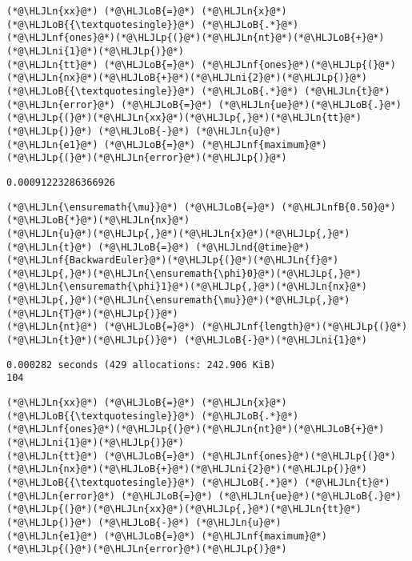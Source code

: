 \documentclass[12pt,landscape]{article}
\newcommand{\HLJLn}[1]{#1}
\newcommand{\HLJLnd}[1]{\textcolor[RGB]{214,102,97}{#1}}
\newcommand{\HLJLnf}[1]{\textcolor[RGB]{66,102,213}{#1}}
\newcommand{\HLJLnfB}[1]{\textcolor[RGB]{59,151,46}{#1}}
\newcommand{\HLJLni}[1]{\textcolor[RGB]{59,151,46}{#1}}
\newcommand{\HLJLoB}[1]{\textcolor[RGB]{102,102,102}{\textbf{#1}}}
\newcommand{\HLJLp}[1]{#1}
\begin{document}
{\begin{lstlisting}
(*@\HLJLn{xx}@*) (*@\HLJLoB{=}@*) (*@\HLJLn{x}@*)(*@\HLJLoB{{\textquotesingle}}@*) (*@\HLJLoB{.*}@*) (*@\HLJLnf{ones}@*)(*@\HLJLp{(}@*)(*@\HLJLn{nt}@*)(*@\HLJLoB{+}@*)(*@\HLJLni{1}@*)(*@\HLJLp{)}@*)
(*@\HLJLn{tt}@*) (*@\HLJLoB{=}@*) (*@\HLJLnf{ones}@*)(*@\HLJLp{(}@*)(*@\HLJLn{nx}@*)(*@\HLJLoB{+}@*)(*@\HLJLni{2}@*)(*@\HLJLp{)}@*)(*@\HLJLoB{{\textquotesingle}}@*) (*@\HLJLoB{.*}@*) (*@\HLJLn{t}@*)
(*@\HLJLn{error}@*) (*@\HLJLoB{=}@*) (*@\HLJLn{ue}@*)(*@\HLJLoB{.}@*)(*@\HLJLp{(}@*)(*@\HLJLn{xx}@*)(*@\HLJLp{,}@*)(*@\HLJLn{tt}@*)(*@\HLJLp{)}@*) (*@\HLJLoB{-}@*) (*@\HLJLn{u}@*) 
(*@\HLJLn{e1}@*) (*@\HLJLoB{=}@*) (*@\HLJLnf{maximum}@*)(*@\HLJLp{(}@*)(*@\HLJLn{error}@*)(*@\HLJLp{)}@*)
\end{lstlisting}

\begin{lstlisting}
0.00091223286366926
\end{lstlisting}


\begin{lstlisting}
(*@\HLJLn{\ensuremath{\mu}}@*) (*@\HLJLoB{=}@*) (*@\HLJLnfB{0.50}@*)(*@\HLJLoB{*}@*)(*@\HLJLn{nx}@*)
(*@\HLJLn{u}@*)(*@\HLJLp{,}@*)(*@\HLJLn{x}@*)(*@\HLJLp{,}@*)(*@\HLJLn{t}@*) (*@\HLJLoB{=}@*) (*@\HLJLnd{@time}@*) (*@\HLJLnf{BackwardEuler}@*)(*@\HLJLp{(}@*)(*@\HLJLn{f}@*)(*@\HLJLp{,}@*)(*@\HLJLn{\ensuremath{\phi}0}@*)(*@\HLJLp{,}@*)(*@\HLJLn{\ensuremath{\phi}1}@*)(*@\HLJLp{,}@*)(*@\HLJLn{nx}@*)(*@\HLJLp{,}@*)(*@\HLJLn{\ensuremath{\mu}}@*)(*@\HLJLp{,}@*)(*@\HLJLn{T}@*)(*@\HLJLp{)}@*)
(*@\HLJLn{nt}@*) (*@\HLJLoB{=}@*) (*@\HLJLnf{length}@*)(*@\HLJLp{(}@*)(*@\HLJLn{t}@*)(*@\HLJLp{)}@*) (*@\HLJLoB{-}@*)(*@\HLJLni{1}@*)
\end{lstlisting}

\begin{lstlisting}
0.000282 seconds (429 allocations: 242.906 KiB)
104
\end{lstlisting}


\begin{lstlisting}
(*@\HLJLn{xx}@*) (*@\HLJLoB{=}@*) (*@\HLJLn{x}@*)(*@\HLJLoB{{\textquotesingle}}@*) (*@\HLJLoB{.*}@*) (*@\HLJLnf{ones}@*)(*@\HLJLp{(}@*)(*@\HLJLn{nt}@*)(*@\HLJLoB{+}@*)(*@\HLJLni{1}@*)(*@\HLJLp{)}@*)
(*@\HLJLn{tt}@*) (*@\HLJLoB{=}@*) (*@\HLJLnf{ones}@*)(*@\HLJLp{(}@*)(*@\HLJLn{nx}@*)(*@\HLJLoB{+}@*)(*@\HLJLni{2}@*)(*@\HLJLp{)}@*)(*@\HLJLoB{{\textquotesingle}}@*) (*@\HLJLoB{.*}@*) (*@\HLJLn{t}@*)
(*@\HLJLn{error}@*) (*@\HLJLoB{=}@*) (*@\HLJLn{ue}@*)(*@\HLJLoB{.}@*)(*@\HLJLp{(}@*)(*@\HLJLn{xx}@*)(*@\HLJLp{,}@*)(*@\HLJLn{tt}@*)(*@\HLJLp{)}@*) (*@\HLJLoB{-}@*) (*@\HLJLn{u}@*) 
(*@\HLJLn{e1}@*) (*@\HLJLoB{=}@*) (*@\HLJLnf{maximum}@*)(*@\HLJLp{(}@*)(*@\HLJLn{error}@*)(*@\HLJLp{)}@*)
\end{lstlisting}

}
\end{document}
